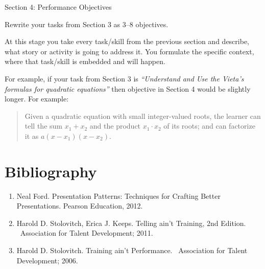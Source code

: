 \documentclass[jou]{apa6}
\begin{document}
\vspace{20pt}
{\large Section 4: Performance Objectives}

Rewrite your tasks from Section 3 as 3--8 objectives.

At this stage you take every task/skill from the previous section and describe, 
what story or activity is going to address it. You formulate the 
specific context, where that task/skill is embedded and will happen.

For example, if your task from Section 3 is 
{\em ``Understand and Use the Vieta's formulas for quadratic equations''}
then objective in Section 4 would be slightly longer. For example:

\begin{quote}
Given a quadratic equation with small integer-valued roots, the learner can tell the 
sum $x_1+x_2$ and the product $x_1 \cdot x_2$ of its roots; 
and can factorize it as $a(x - x_1)(x - x_2)$.
\end{quote}




\section{Bibliography}

\begin{enumerate}
\item Neal Ford. Presentation Patterns: Techniques for Crafting Better Presentations. Pearson Education, 2012.
\item Harold D. Stolovitch, Erica J. Keeps. Telling ain’t Training, 2nd Edition.  Association for Talent Development; 2011. 
\item Harold D. Stolovitch. Training ain’t Performance.  Association for Talent Development; 2006.
\end{enumerate}
\end{document}
